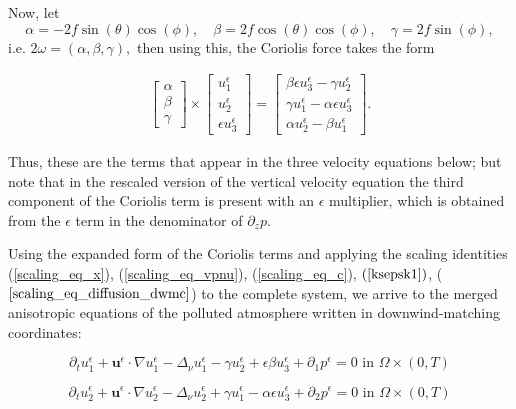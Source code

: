 \documentclass[12pt]{report}
\numberwithin{theorem}{chapter}
\numberwithin{corollary}{chapter}
\numberwithin{lemma}{chapter}
\numberwithin{remark}{chapter}
\numberwithin{definition}{chapter}
\numberwithin{prop}{chapter}
\begin{document}
Now, let
%
$$\alpha = -2 f \sin(\theta)\cos(\phi), \quad \beta = 2 f \cos(\theta) \cos(\phi), \quad \gamma = 2 f \sin(\phi),$$
%
i.e. $2 \omega = (\alpha, \beta, \gamma),$ then using this, the Coriolis force takes the form

\begin{gather}
\begin{bmatrix} \alpha \\ \beta \\ \gamma \end{bmatrix}
 \times
 \begin{bmatrix} u^\epsilon_1 \\ u^\epsilon_2 \\ \epsilon u^\epsilon_3 \end{bmatrix}
 =
 \begin{bmatrix}  \beta \epsilon u^\epsilon_3 - \gamma u^\epsilon_2 \\ \gamma u^\epsilon_1 - \alpha \epsilon u^\epsilon_3  \\ \alpha u^\epsilon_2 - \beta u^\epsilon_1 \end{bmatrix}.
\end{gather}

Thus, these are the terms that appear in the three velocity equations below; but note that in the rescaled version of the vertical velocity equation the third component of the Coriolis term is present with an $\epsilon$ multiplier, which is obtained from the $\epsilon$ term in the denominator of $\partial_z p.$

Using the expanded form of the Coriolis terms and applying the scaling identities (\ref{scaling_eq_x}), (\ref{scaling_eq_vpnu}), (\ref{scaling_eq_c}), $(\ref{ksepsk1})$, ($\ref{scaling_eq_diffusion_dwmc}$) to the complete system, we arrive to the merged anisotropic equations of the polluted atmosphere written in downwind-matching coordinates:

\begin{equation} \label{ANSC1_coordinates_DWMC_intro}
  \partial_t u^\epsilon _1 + \mathbf{u}^\epsilon \cdot \nabla u^\epsilon _1 -\Delta_\nu u^\epsilon _1 -\gamma u_2^\epsilon + \epsilon \beta u_3^\epsilon + \partial_1 p^\epsilon = 0 \text{ in } \Omega \times (0,T)
\end{equation}

\begin{equation} \label{ANSC2_coordinates_DWMC_intro}
  \partial_t u_2^\epsilon + \mathbf{u}^\epsilon \cdot \nabla u_2^\epsilon -\Delta_\nu u_2^\epsilon + \gamma u_1^\epsilon - \alpha \epsilon u^\epsilon_3  + \partial_2 p^\epsilon = 0 \text{ in } \Omega \times (0,T)
\end{equation}
\end{document}
